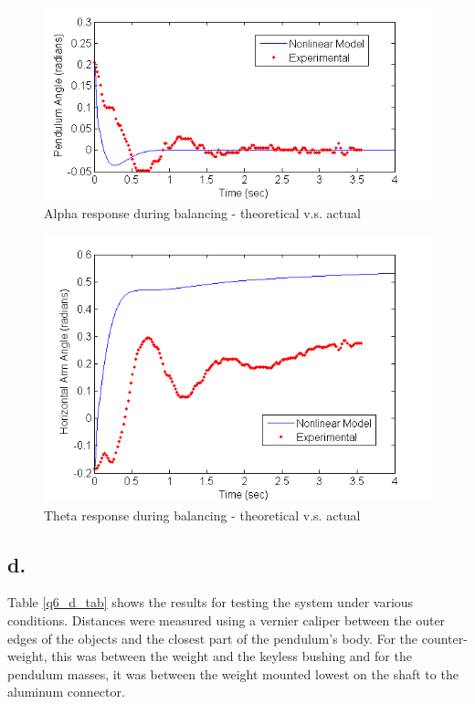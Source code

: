 \documentclass{article}
\theoremstyle{plain}
\theoremstyle{definition}
\theoremstyle{remark}
\begin{document}
\begin{figure}[htb]
\begin{center}
\includegraphics[width = 16cm]{Q6_C_Alpha.png}
\end{center}
\caption{Alpha response during balancing - theoretical v.s. actual}
\label{q6_c_alpha}
\end{figure}

\begin{figure}[htb]
\begin{center}
\includegraphics[width = 16cm]{Q6_C_Theta.png}
\end{center}
\caption{Theta response during balancing - theoretical v.s. actual}
\label{q6_c_theta}
\end{figure}

\clearpage

\subsection*{d.}

Table \ref{q6_d_tab} shows the results for testing the system under various conditions. Distances were measured using a vernier caliper between the outer edges of the objects and the closest part of the pendulum's body. For the counter-weight, this was between the weight and the keyless bushing and for the pendulum masses, it was between the weight mounted lowest on the shaft to the aluminum connector.\\
\end{document}
